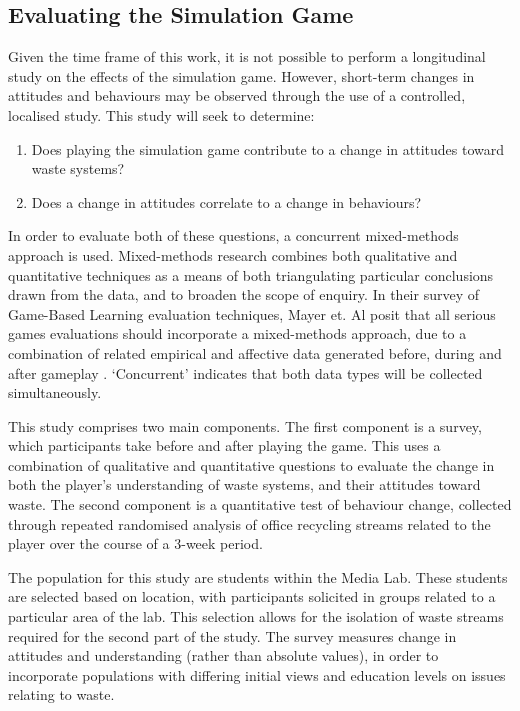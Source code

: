 \documentclass[nofonts,nols,justified,nobib]{tufte-book}
\begin{document}
\subsection*{Evaluating the Simulation Game}

Given the time frame of this work, it is not possible to perform a longitudinal study on the effects of the simulation game. However, short-term changes in attitudes and behaviours may be observed through the use of a controlled, localised study. This study will seek to determine:
\begin{enumerate}
\item Does playing the simulation game contribute to a change in attitudes toward waste systems?
\item Does a change in attitudes correlate to a change in behaviours?
\end{enumerate}

In order to evaluate both of these questions, a concurrent mixed-methods approach is used. Mixed-methods research combines both qualitative and quantitative techniques as a means of both triangulating particular conclusions drawn from the data, and to broaden the scope of enquiry. In their survey of Game-Based Learning evaluation techniques, Mayer et. Al posit that all serious games evaluations should incorporate a mixed-methods approach, due to a combination of related empirical and affective data generated before, during and after gameplay \cite{mayer_research_2014}. `Concurrent' indicates that both data types will be collected simultaneously.

This study comprises two main components. The first component is a survey, which participants take before and after playing the game. This uses a combination of qualitative and quantitative questions to evaluate the change in both the player's understanding of waste systems, and their attitudes toward waste. The second component is a quantitative test of behaviour change, collected through repeated randomised analysis of office recycling streams related to the player over the course of a 3-week period.

The population for this study are students within the Media Lab. These students are selected based on location, with participants solicited in groups related to a particular area of the lab. This selection allows for the isolation of waste streams required for the second part of the study. The survey measures change in attitudes and understanding (rather than absolute values), in order to incorporate populations with differing initial views and education levels on issues relating to waste.
\end{document}

